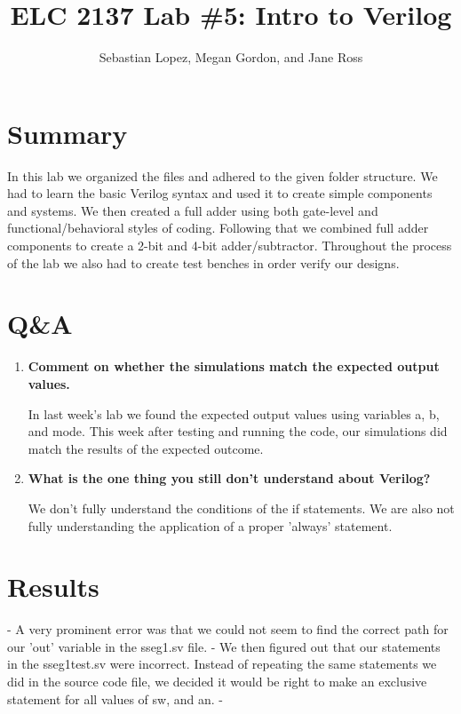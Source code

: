 \documentclass[11pt]{article}
\begin{document}
\title{ELC 2137 Lab \#5: Intro to Verilog }
\author{Sebastian Lopez, Megan Gordon, and Jane Ross }

\maketitle


\section*{Summary}

In this lab we organized the files and adhered to the given folder structure. We had to learn the basic Verilog syntax and used it to create simple components and systems. We then created a full adder using both gate-level and functional/behavioral styles of coding. Following that we combined full adder components to create a 2-bit and 4-bit adder/subtractor. Throughout the process of the lab we also had to create test benches in order verify our designs.  

\section*{Q\&A}


\begin{enumerate}
	\item \textbf{Comment on whether the simulations match the expected output values.} 
		
	In last week's lab we found the expected output values using variables a, b, and mode. This week after testing and running the code, our simulations did match the results of the expected outcome.  
	
	\item \textbf{What is the one thing you still don't understand about Verilog?}
	
	We don't fully understand the conditions of the if statements. We are also not fully understanding the application of a proper 'always' statement. 
	 
\end{enumerate}

\section*{Results}

	- A very prominent error was that we could not seem to find the correct path for our 'out' variable in the sseg1.sv file.  
	- We then figured out that our statements in the sseg1test.sv were incorrect. Instead of repeating the same statements we did in the source code file, we decided it would be right 
	      to make an exclusive statement for all values of sw, and an.
	- 
\end{document}
